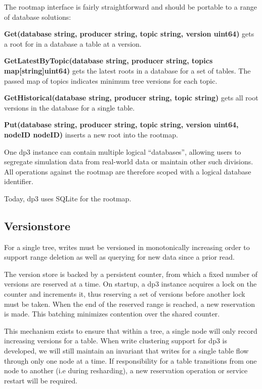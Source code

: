 \documentclass[9pt,twocolumn]{article}
\newcommand{\q}[1]{``#1''}
\begin{document}
    The rootmap interface is fairly straightforward and should be portable to a
    range of database solutions:

    \textbf{Get(database string, producer string, topic string, version uint64)}
    gets a root for in a database a table at a version.

    \textbf{GetLatestByTopic(database string, producer string, topics
    map[string]uint64)} gets the latest roots in a database for a set of tables.
    The passed map of topics indicates minimum tree versions for each topic.

    \textbf{GetHistorical(database string, producer string, topic string)} gets
    all root versions in the database for a single table.

    \textbf{Put(database string, producer string, topic string, version uint64,
    nodeID nodeID)} inserts a new root into the rootmap.

    One dp3 instance can contain multiple logical \q{databases}, allowing users to
    segregate simulation data from real-world data or maintain other such
    divisions. All operations against the rootmap are therefore scoped with a
    logical database identifier.

    Today, dp3 uses SQLite \cite{sqlite} for the rootmap.

    \subsection{Versionstore} \label{versionstore}
    For a single tree, writes must be versioned in monotonically increasing order
    to support range deletion as well as querying for new data since a prior read.

    The version store is backed by a persistent counter, from which a fixed
    number of versions are reserved at a time. On startup, a dp3 instance
    acquires a lock on the counter and increments it, thus reserving a set of
    versions before another lock must be taken. When the end of the
    reserved range is reached, a new reservation is made. This batching
    minimizes contention over the shared counter.

    This mechanism exists to ensure that within a tree, a single node will only
    record increasing versions for a table. When write clustering support for dp3
    is developed, we will still maintain an invariant that writes for a single
    table flow through only one node at a time. If responsibility for a table
    transitions from one node to another (i.e during resharding), a new
    reservation operation or service restart will be required.
\end{document}
